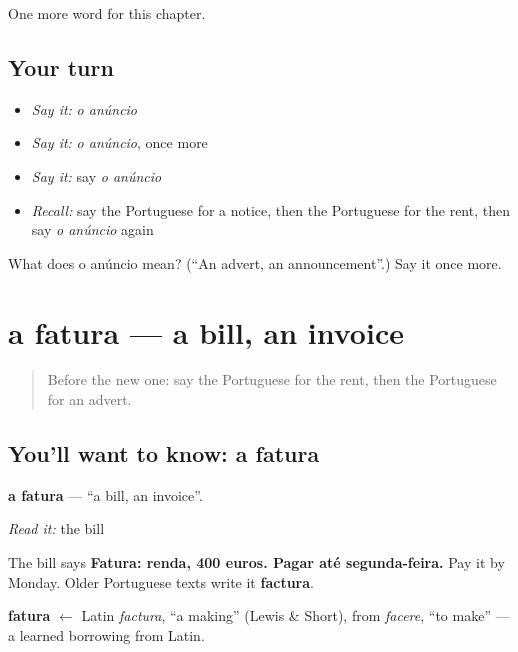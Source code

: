 \begin{grammarlens}[title={What you've built}]
One more word for this chapter.
\end{grammarlens}

\subsection*{Your turn}
\begin{itemize}
\raggedright
  \item \emph{Say it:} \emph{o anúncio}
  \item \emph{Say it:} \emph{o anúncio}, once more
  \item \emph{Say it:} say \emph{o anúncio}
  \item \emph{Recall:} say the Portuguese for a notice, then the Portuguese for the rent, then say \emph{o anúncio} again
\end{itemize}

\begin{tcolorbox}[breakable,colback=teal!4,colframe=teal!35!black,title={Before you move on}]
What does o anúncio mean? (\textquotedblleft{}An advert, an announcement\textquotedblright{}.) Say it once more.
\end{tcolorbox}
\section[a fatura]{a fatura — a bill, an invoice}

\label{lesson:PT-C137-a-fatura}



\begin{quote}
Before the new one: say the Portuguese for the rent, then the Portuguese for an advert.
\end{quote}

\subsection*{You'll want to know: a fatura}
\textbf{a fatura} — \textquotedblleft{}a bill, an invoice\textquotedblright{}.

\emph{Read it:} the bill

The bill says \textbf{Fatura: renda, 400 euros. Pagar até segunda-feira.} Pay it by Monday. Older Portuguese texts write it \textbf{factura}.

\begin{cousinweb}
\textbf{fatura} $\leftarrow$ Latin \emph{factura}, \textquotedblleft{}a making\textquotedblright{} (Lewis \& Short), from \emph{facere}, \textquotedblleft{}to make\textquotedblright{} — a learned borrowing from Latin.
\end{cousinweb}

